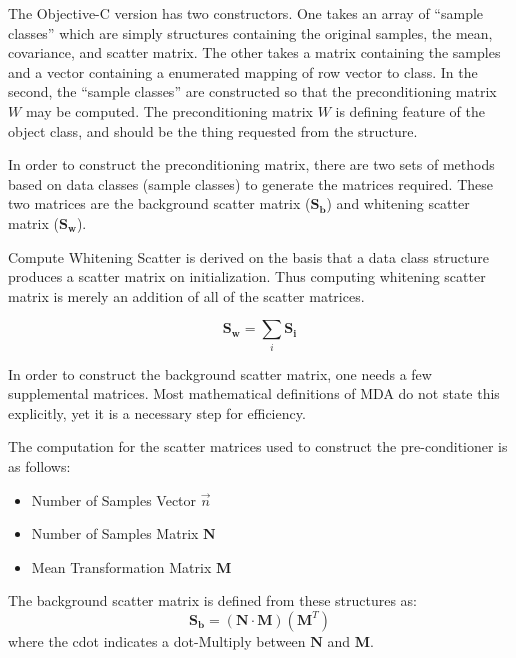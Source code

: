 \documentclass[11pt]{article}
\begin{document}
The Objective-C version has two constructors.  One takes an array of ``sample classes'' which are simply structures containing the original samples, the mean, covariance, and scatter matrix.  The other takes a matrix containing the samples and a vector containing a enumerated mapping of row vector to class.    In the second, the ``sample classes'' are constructed so that the preconditioning matrix $W$ may be computed.  The preconditioning matrix $W$ is defining feature of the object class, and should be the thing requested from the structure.  

In order to construct the preconditioning matrix, there are two sets of methods based on data classes (sample classes) to generate the matrices required.  These two matrices are the background scatter matrix ($\mathbf{S_b}$) and whitening scatter matrix ($\mathbf{S_w}$).  

Compute Whitening Scatter is derived on the basis that a data class structure produces a scatter matrix on initialization.  Thus computing whitening scatter matrix is merely an addition of all of the scatter matrices.  

\begin{equation}
\mathbf{S_w} = \sum _i \mathbf{S_i}
\end{equation}

In order to construct the background scatter matrix, one needs a few supplemental matrices.  Most mathematical definitions of MDA do not state this explicitly, yet it is a necessary step for efficiency.  

The computation for the scatter matrices used to construct the pre-conditioner is as follows:
\begin{itemize}
	\item Number of Samples Vector $\vec{n}$
	\item Number of Samples Matrix $\mathbf{N}$
	\item Mean Transformation Matrix $\mathbf{M}$
\end{itemize}
The background scatter matrix is defined from these structures as:
\begin{equation}
	\mathbf{S_b} = (\mathbf{N} \cdot \mathbf{M})(\mathbf{M}^T) 
\end{equation}
where the cdot indicates a dot-Multiply between $\mathbf{N}$ and $\mathbf{M}$.  %
\end{document}
